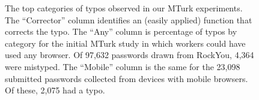\begin{figure}[t]
  
  \caption{The top categories of typos observed in our MTurk experiments.  The
    ``Corrector'' column identifies an (easily applied) function that corrects
    the typo. The ``Any'' column is percentage of typos by category for the
    initial MTurk study in which workers could have used any browser. Of 97,632
    passwords drawn from RockYou, 4,364 were mistyped.  The ``Mobile'' column is
    the same for the 23,098 submitted passwords collected from devices with
    mobile browsers.  Of these, 2,075 had a typo. }
\label{fig:top10-typo}
\label{fig:top-typo-mobile}
\end{figure}



